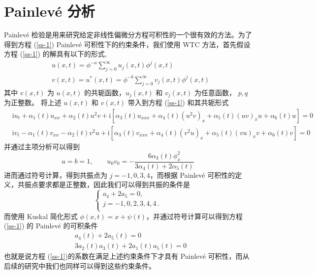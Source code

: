 \section{Painlev\'{e} 分析}
Painlev\'{e} 检验是用来研究给定非线性偏微分方程可积性的一个很有效的方法。为了得到方程 (\ref{ss-1}) Painlev\'{e} 可积性下的约束条件，我们使用  WTC 方法，首先假设方程 (\ref{ss-1}) 的解具有以下的形式,
\begin{align}
  & u(x,t) = \phi^{-a}\sum_{j=0}^{\infty}u_j(x,t)\phi^j(x,t) \\
  & v(x,t) = u^*(x,t) = \phi^{-b}\sum_{j=0}^{\infty}v_j(x,t)\phi^j(x,t)
\end{align}
其中 $v(x,t)$ 为 $u(x,t)$ 的共轭函数，$u_j(x,t)$ 和 $v_j(x,t)$ 为任意函数， $p, q$ 为正整数。
将上述 $u(x,t)$ 和 $v(x,t)$ 带入到方程 (\ref{ss-1}) 和其共轭形式
\begin{align}
  & \mathrm{i}u_{t} + \alpha_{1}(t)u_{xx} + \alpha_2(t)u^{2}v + \mathrm{i}\left[\alpha_3(t)u_{xxx} + \alpha_{4}(t)(u^{2}v)_{x} + \alpha_{5}(t)(uv)_{x}u + \alpha_{6}(t)u \right] = 0  \\
  & \mathrm{i}v_{t} - \alpha_{1}(t)v_{xx} - \alpha_2(t)v^{2}u + \mathrm{i}\left[\alpha_3(t)v_{xxx} + \alpha_{4}(t)(v^{2}u)_{x} + \alpha_{5}(t)(vu)_{x}v + \alpha_{6}(t)v \right] = 0
\end{align}
并通过主项分析可以得到
\begin{equation}
    a = b = 1, \qquad u_0v_0 = -\frac{6\alpha_3(t)\phi_x^2}{3\alpha_4(t) + 2\alpha_5(t)}
\end{equation}
进而通过符号计算，得到共振点为 $j = -1,0,3,4$，而根据 Painlev\'{e} 可积性的定义，共振点要求都是正整数，因此我们可以得到共振的条件是
\begin{equation}
\left\{ \begin{array}{l}
{a_4} + 2{a_5} = 0 ,\\
{j =  - 1,0,2,3,4,4}\, . \\
\end{array} \right.
\end{equation}
而使用 Kuskal 简化形式 $\phi(x,t) = x + \psi(t)$，并通过符号计算可以得到方程 (\ref{ss-1}) 的 Painlev\'{e} 的可积条件
\begin{align}
&a_4(t)+2a_5(t)=0\\
&3a_2(t)a_3(t)+2a_1(t)a_5(t)=0
\end{align}
也就是说方程 (\ref{ss-1})的系数在满足上述约束条件下才具有  Painlev\'{e} 可积性，而从后续的研究中我们也同样可以得到这些约束条件。




